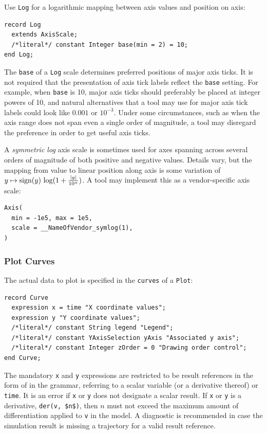 Use \lstinline!Log! for a logarithmic mapping between axis values and position on axis:
\begin{lstlisting}[language=modelica]
record Log
  extends AxisScale;
  /*literal*/ constant Integer base(min = 2) = 10;
end Log;
\end{lstlisting}%

The \lstinline!base! of a \lstinline!Log! scale determines preferred positions of major axis ticks.
It is not required that the presentation of axis tick labels reflect the \lstinline!base! setting.
For example, when \lstinline!base! is 10, major axis ticks should preferably be placed at integer powers of 10, and natural alternatives that a tool may use for major axis tick labels could look like $0.001$ or $10^{-3}$.
Under some circumstances, such as when the axis range does not span even a single order of magnitude, a tool may disregard the preference in order to get useful axis ticks.

\begin{example}
A \emph{symmetric log} axis scale is sometimes used for axes spanning across several orders of magnitude of both positive and negative values.
Details vary, but the mapping from value to linear position along axis is some variation of $y \mapsto \operatorname{sign}(y)\, \operatorname{log}(1 + \frac{\left\lvert y{} \right\rvert}{10^{\alpha}})$.
A tool may implement this as a vendor-specific axis scale:
\begin{lstlisting}[language=modelica]
Axis(
  min = -1e5, max = 1e5,
  scale = __NameOfVendor_symlog(1),
)
\end{lstlisting}
\end{example}

\subsubsection{Plot Curves}\label{plot-curves}

The actual data to plot is specified in the \lstinline!curves! of a \lstinline!Plot!:
\begin{lstlisting}[language=modelica]
record Curve
  expression x = time "X coordinate values";
  expression y "Y coordinate values";
  /*literal*/ constant String legend "Legend";
  /*literal*/ constant YAxisSelection yAxis "Associated y axis";
  /*literal*/ constant Integer zOrder = 0 "Drawing order control";
end Curve;
\end{lstlisting}

The mandatory \lstinline!x! and \lstinline!y! expressions are restricted to be result references in the form of  in the grammar, referring to a scalar variable (or a derivative thereof) or \lstinline!time!.
It is an error if \lstinline!x! or \lstinline!y! does not designate a scalar result.
If \lstinline!x! or \lstinline!y! is a derivative, \lstinline!der(v, $n$)!, then $n$ must not exceed the maximum amount of differentiation applied to \lstinline!v! in the model.
A diagnostic is recommended in case the simulation result is missing a trajectory for a valid result reference.

